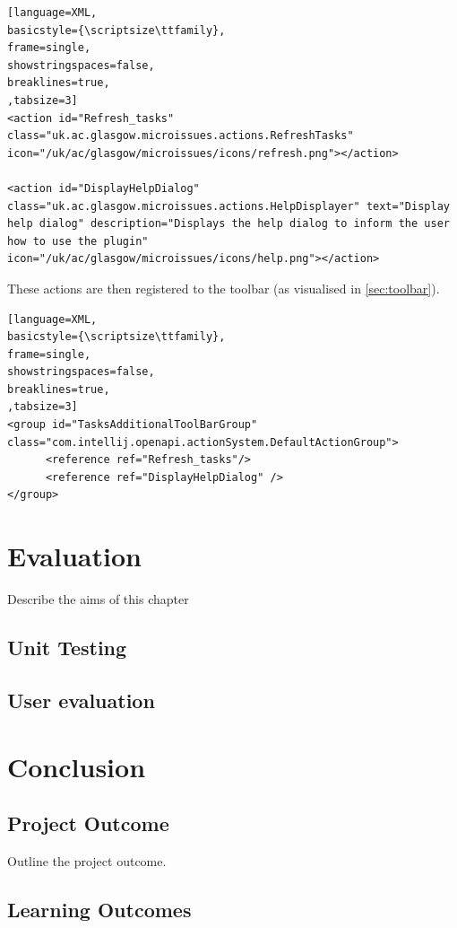 \documentclass{4thYearProject}
\begin{document}
\begin{lstlisting}[language=XML, 
basicstyle={\scriptsize\ttfamily}, 
frame=single,
showstringspaces=false,
breaklines=true,
,tabsize=3]
<action id="Refresh_tasks" class="uk.ac.glasgow.microissues.actions.RefreshTasks" icon="/uk/ac/glasgow/microissues/icons/refresh.png"></action>

<action id="DisplayHelpDialog" class="uk.ac.glasgow.microissues.actions.HelpDisplayer" text="Display help dialog" description="Displays the help dialog to inform the user how to use the plugin" icon="/uk/ac/glasgow/microissues/icons/help.png"></action>

\end{lstlisting}

These actions are then registered to the toolbar (as visualised in \ref{sec:toolbar}).

\begin{lstlisting}[language=XML, 
basicstyle={\scriptsize\ttfamily}, 
frame=single,
showstringspaces=false,
breaklines=true,
,tabsize=3]
<group id="TasksAdditionalToolBarGroup" class="com.intellij.openapi.actionSystem.DefaultActionGroup">
      <reference ref="Refresh_tasks"/>
      <reference ref="DisplayHelpDialog" />
</group>

\end{lstlisting}

\chapter{Evaluation}

Describe the aims of this chapter

\section{Unit Testing}
\section{User evaluation}\label{sec:usereval}

\chapter{Conclusion}

\section{Project Outcome}

Outline the project outcome. 

\section{Learning Outcomes}







\begin{appendices}
\end{appendices}
\end{document}
